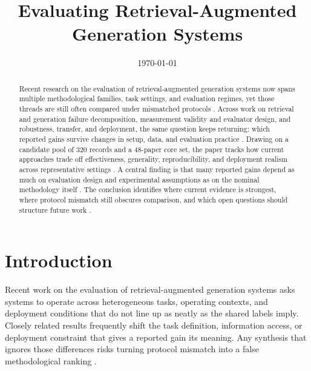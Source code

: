 \documentclass[a4paper,11pt]{article}
\title{Evaluating Retrieval-Augmented Generation Systems}
\author{}
\date{\today}
\begin{document}
\maketitle

\begin{abstract}


Recent research on the evaluation of retrieval-augmented generation systems now spans multiple methodological families, task settings, and evaluation regimes, yet those threads are still often compared under mismatched protocols \citep{Sun2026Robust,Kim2024Learning,Salemi2024Evaluating,Taiwo2026Evaluating,Kovalskii2026Domain,Tian2026Predicting}. Across work on retrieval and generation failure decomposition, measurement validity and evaluator design, and robustness, transfer, and deployment, the same question keeps returning: which reported gains survive changes in setup, data, and evaluation practice \citep{Caruzzo2026Deceptive,Ding2026Attribution,Murugaraj2025Ragvue,Nematov2025Source,SaadFalcon2023Ares,Upadhyay2026Overview}. Drawing on a candidate pool of 320 records and a 48-paper core set, the paper tracks how current approaches trade off effectiveness, generality, reproducibility, and deployment realism across representative settings \citep{Yao2026Authoritybench,An2026Fresco,Li2026Mrag,Guder2026Rage,Brehme2025Retrieval,Packowski2024Optimizing}. A central finding is that many reported gains depend as much on evaluation design and experimental assumptions as on the nominal methodology itself \citep{Muthyam2026Systems,Feng2026Rethinking,Su2025Dynamic,Bang2026Feedback,Cahoon2025Optimizing,Javadi2025Contradictions}. The conclusion identifies where current evidence is strongest, where protocol mismatch still obscures comparison, and which open questions should structure future work \citep{Wampler2025Engineering,Zhou2024Trustworthiness}.
\end{abstract}

\section{Introduction}


Recent work on the evaluation of retrieval-augmented generation systems asks systems to operate across heterogeneous tasks, operating contexts, and deployment conditions that do not line up as neatly as the shared labels imply. Closely related results frequently shift the task definition, information access, or deployment constraint that gives a reported gain its meaning. Any synthesis that ignores those differences risks turning protocol mismatch into a false methodological ranking \citep{Sun2026Robust,Kim2024Learning,Salemi2024Evaluating,Taiwo2026Evaluating}.
\end{document}
